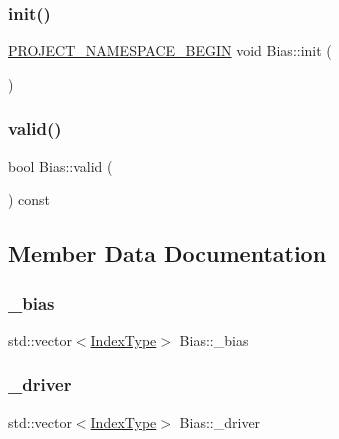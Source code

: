 \subsubsection{\texorpdfstring{init()}{init()}}
{\footnotesize\ttfamily \hyperlink{namespace_8h_ae48726a24dab2034454cf6d79e531eb8}{P\+R\+O\+J\+E\+C\+T\+\_\+\+N\+A\+M\+E\+S\+P\+A\+C\+E\+\_\+\+B\+E\+G\+IN} void Bias\+::init (\begin{DoxyParamCaption}{ }\end{DoxyParamCaption})}

\mbox{\label{classBias_ae917e3b0f32f52639db370bc49766328}} 
\subsubsection{\texorpdfstring{valid()}{valid()}}
{\footnotesize\ttfamily bool Bias\+::valid (\begin{DoxyParamCaption}{ }\end{DoxyParamCaption}) const\hspace{0.3cm}{\ttfamily [inline]}}



\subsection{Member Data Documentation}
\mbox{\label{classBias_a8b24bf7291399bf389c9c73d585a02f2}} 
\subsubsection{\texorpdfstring{\+\_\+bias}{\_bias}}
{\footnotesize\ttfamily std\+::vector$<$\hyperlink{type_8h_a581e8093e28e7362f2b6937296190676}{Index\+Type}$>$ Bias\+::\+\_\+bias\hspace{0.3cm}{\ttfamily [private]}}

\mbox{\label{classBias_a51db005f686c23b55031be0e6daf3fdd}} 
\subsubsection{\texorpdfstring{\+\_\+driver}{\_driver}}
{\footnotesize\ttfamily std\+::vector$<$\hyperlink{type_8h_a581e8093e28e7362f2b6937296190676}{Index\+Type}$>$ Bias\+::\+\_\+driver\hspace{0.3cm}{\ttfamily [private]}}

